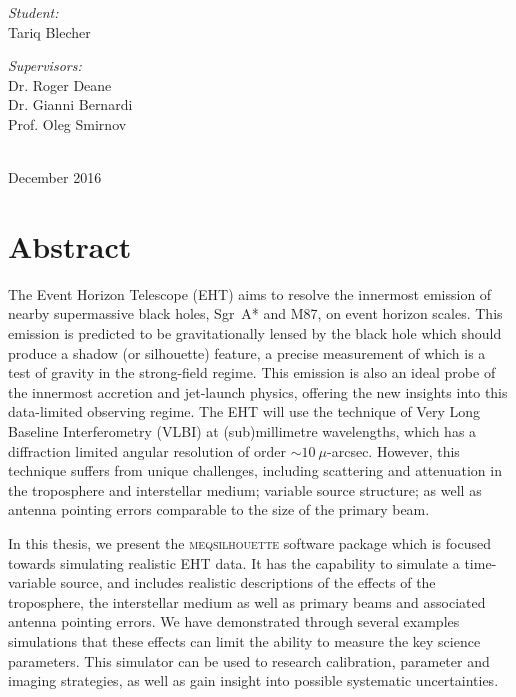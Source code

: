 \begin{titlepage}
\begin{minipage}{0.45\textwidth}
\begin{flushleft}\large 
\emph{Student:} \\
Tariq  {\sc Blecher}\\
\end{flushleft}
\end{minipage}
\begin{minipage}{0.45\textwidth}

\begin{flushright} \large
\emph{Supervisors:} \\
Dr. Roger {\sc Deane} \\
Dr. Gianni {\sc Bernardi} \\
Prof. Oleg {\sc Smirnov} \\
\end{flushright}
\end{minipage}\\[2cm]


{\large December 2016}

\end{titlepage}

\chapter*{Abstract} 
The Event Horizon Telescope (EHT) aims to resolve the innermost emission of nearby supermassive black holes, Sgr~A* and M87, on event horizon scales. This emission is predicted to be gravitationally lensed by the black hole which should produce a shadow (or silhouette) feature, a precise measurement of which is a test of gravity in the strong-field regime. This emission is also an ideal probe of the innermost accretion and jet-launch physics, offering the new insights into this data-limited observing regime. The EHT will use the technique of Very Long Baseline Interferometry (VLBI) at (sub)millimetre wavelengths, which has a diffraction limited angular resolution of order $\sim10~\mu$-arcsec. However, this technique suffers from unique challenges, including scattering and attenuation in the troposphere and interstellar medium; variable source structure; as well as antenna pointing errors comparable to the size of the primary beam. 


In this thesis, we present the \textsc{meqsilhouette} software package which is focused towards simulating realistic EHT data. It has the capability to simulate a time-variable source, and includes realistic descriptions of the effects of the troposphere, the interstellar medium as well as primary beams and associated antenna pointing errors. We have demonstrated through several examples simulations that these effects can limit the ability to measure the key science parameters. This simulator can be used to research calibration, parameter and imaging strategies, as well as gain insight into possible systematic uncertainties. 

